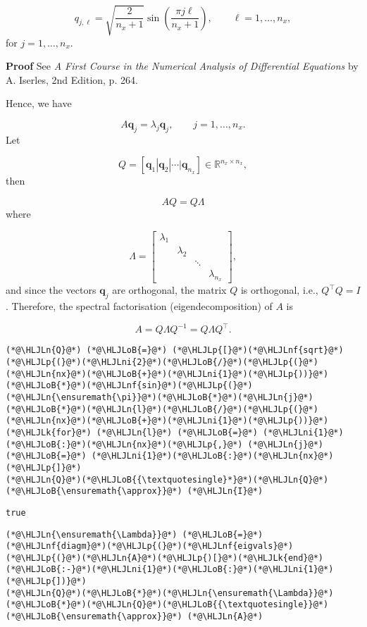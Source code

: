 \documentclass[12pt,landscape]{article}
\newcommand{\HLJLk}[1]{\textcolor[RGB]{148,91,176}{\textbf{#1}}}
\newcommand{\HLJLn}[1]{#1}
\newcommand{\HLJLnf}[1]{\textcolor[RGB]{66,102,213}{#1}}
\newcommand{\HLJLni}[1]{\textcolor[RGB]{59,151,46}{#1}}
\newcommand{\HLJLoB}[1]{\textcolor[RGB]{102,102,102}{\textbf{#1}}}
\newcommand{\HLJLp}[1]{#1}
\begin{document}
{\[
q_{j,\ell} = \sqrt{\frac{2}{n_x+1}}\sin\left(\frac{\pi j \ell}{n_x+1}   \right), \qquad \ell = 1, \ldots, n_x,
\]
for $j = 1, \ldots, n_x$.

\textbf{Proof} See \emph{A First Course in the Numerical Analysis of Differential Equations} by A. Iserles, 2nd Edition, p. 264.

Hence, we have

\[
A\mathbf{q}_j = \lambda_j\mathbf{q}_j, \qquad j = 1, \ldots, n_x.
\]
Let

\[
Q = \left[\mathbf{q}_1 |  \mathbf{q}_2 | \cdots | \mathbf{q}_{n_x}  \right] \in \mathbb{R}^{n_x \times n_x},
\]
then

\[
AQ = Q\Lambda
\]
where

\[
\Lambda = \begin{bmatrix}
\lambda_1 & & & \\
& \lambda_2 & & \\
 & & \ddots &  \\
&  & & \lambda_{n_x}
\end{bmatrix},
\]
and since the vectors $\mathbf{q}_j$ are orthogonal, the matrix $Q$ is orthogonal, i.e.,  $Q^{\top}Q = I$. Therefore, the spectral factorisation (eigendecomposition) of $A$ is

\[
A = Q\Lambda Q^{-1} =  Q\Lambda Q^{\top}.
\]

\begin{lstlisting}
(*@\HLJLn{Q}@*) (*@\HLJLoB{=}@*) (*@\HLJLp{[}@*)(*@\HLJLnf{sqrt}@*)(*@\HLJLp{(}@*)(*@\HLJLni{2}@*)(*@\HLJLoB{/}@*)(*@\HLJLp{(}@*)(*@\HLJLn{nx}@*)(*@\HLJLoB{+}@*)(*@\HLJLni{1}@*)(*@\HLJLp{))}@*)(*@\HLJLoB{*}@*)(*@\HLJLnf{sin}@*)(*@\HLJLp{(}@*)(*@\HLJLn{\ensuremath{\pi}}@*)(*@\HLJLoB{*}@*)(*@\HLJLn{j}@*)(*@\HLJLoB{*}@*)(*@\HLJLn{l}@*)(*@\HLJLoB{/}@*)(*@\HLJLp{(}@*)(*@\HLJLn{nx}@*)(*@\HLJLoB{+}@*)(*@\HLJLni{1}@*)(*@\HLJLp{))}@*) (*@\HLJLk{for}@*) (*@\HLJLn{l}@*) (*@\HLJLoB{=}@*) (*@\HLJLni{1}@*)(*@\HLJLoB{:}@*)(*@\HLJLn{nx}@*)(*@\HLJLp{,}@*) (*@\HLJLn{j}@*) (*@\HLJLoB{=}@*) (*@\HLJLni{1}@*)(*@\HLJLoB{:}@*)(*@\HLJLn{nx}@*)(*@\HLJLp{]}@*)
(*@\HLJLn{Q}@*)(*@\HLJLoB{{\textquotesingle}*}@*)(*@\HLJLn{Q}@*) (*@\HLJLoB{\ensuremath{\approx}}@*) (*@\HLJLn{I}@*)
\end{lstlisting}

\begin{lstlisting}
true
\end{lstlisting}


\begin{lstlisting}
(*@\HLJLn{\ensuremath{\Lambda}}@*) (*@\HLJLoB{=}@*) (*@\HLJLnf{diagm}@*)(*@\HLJLp{(}@*)(*@\HLJLnf{eigvals}@*)(*@\HLJLp{(}@*)(*@\HLJLn{A}@*)(*@\HLJLp{)[}@*)(*@\HLJLk{end}@*)(*@\HLJLoB{:-}@*)(*@\HLJLni{1}@*)(*@\HLJLoB{:}@*)(*@\HLJLni{1}@*)(*@\HLJLp{])}@*)
(*@\HLJLn{Q}@*)(*@\HLJLoB{*}@*)(*@\HLJLn{\ensuremath{\Lambda}}@*)(*@\HLJLoB{*}@*)(*@\HLJLn{Q}@*)(*@\HLJLoB{{\textquotesingle}}@*) (*@\HLJLoB{\ensuremath{\approx}}@*) (*@\HLJLn{A}@*)
\end{lstlisting}

}
\end{document}
